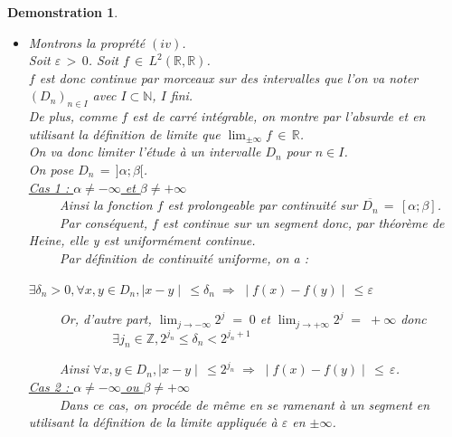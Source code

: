 \documentclass[a4paper,10pt]{report}
\theoremstyle{break}
\newtheorem{Dem}{Demonstration}
\begin{document}
    \begin{Dem}
      \begin{itemize}
       \item [$(iv)$] Montrons la propr\'{e}t\'{e} $(iv)$. \\
	  Soit $\varepsilon \, > \, 0$. Soit $f \, \in \, L^2(\mathbb{R},\mathbb{R})$. \\
	  $f$ est donc continue par morceaux sur des intervalles que l'on va noter $(D_n)_{n \in I}$ avec $I \subset \mathbb{N} $, $I$ fini. \\
	  De plus, comme $f$ est de carr\'{e} int\'{e}grable, on montre par l'absurde et en utilisant la d\'{e}finition de limite
	  que $ \displaystyle \lim_{\pm \infty} f \, \in \, \mathbb{R} $. \\
	  On va donc limiter l'\'{e}tude \`{a} un intervalle $D_n$ pour $n \in I$. \\
	  On pose $D_n \, = \, ]\alpha; \beta[$. \\
	      
	  \underline{Cas 1 : $\alpha \neq - \infty$ et $\beta \neq + \infty$} \\
	  $\phantom{Prop}$ Ainsi la fonction $f$ est prolongeable par continuit\'{e} sur $\overline{D_n} \, = \, [\alpha; \beta]$. \\
	  $\phantom{Prop}$ Par cons\'{e}quent, $f$ est continue sur un segment donc, par th\'{e}or\`{e}me de Heine, elle y est uniform\'{e}ment continue. \\
	  $\phantom{Prop}$ Par d\'{e}finition de continuit\'{e} uniforme, on a :
	  \begin{center}
	    $\exists \delta_n > 0, \forall x, y \in D_n, \mid x - y \mid \, \leqslant \delta_n \; \Rightarrow \; \mid f(x) - f(y) \mid \, \leqslant \varepsilon$
	  \end{center}
	  
\newpage

	  $\phantom{Prop}$ Or, d'autre part, $\displaystyle \lim_{j \rightarrow - \infty} 2^j \; = \; 0$ et 
		$\displaystyle \lim_{j \rightarrow + \infty} 2^j \; = \; + \infty$ donc \\ 
	  $\phantom{PropPropProp}$ $ \exists j_n \in \mathbb{Z}, 2^{j_n} \leqslant \delta_n < 2^{j_n + 1} $
	  
	  $\phantom{Prop}$ Ainsi $\forall x, y \in D_n, \mid x - y \mid \, \leqslant 2^{j_n} \; \Rightarrow \; \mid f(x) - f(y) \mid \, \leqslant \, \varepsilon $. \\
	  
	  \underline{Cas 2 : $\alpha \neq - \infty$ ou $\beta \neq + \infty$} \\
	  $\phantom{Prop}$ Dans ce cas, on proc\'{e}de de m\^{e}me en se ramenant \`{a} un segment en utilisant la d\'{e}finition de la 
	      limite appliqu\'{e}e \`{a} $\varepsilon$ en $\pm \infty$. \\
	  

\end{itemize}
\end{Dem}
\end{document}
